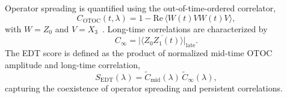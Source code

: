 \documentclass[twocolumn,10pt]{article}
\begin{document}
Operator spreading is quantified using the out-of-time-ordered correlator,
\begin{equation}
C_{\mathrm{OTOC}}(t,\lambda) = 1 - \mathrm{Re}\,\langle W(t) V W(t) V \rangle,
\end{equation}
with $W = Z_0$ and $V = X_3$~\cite{Larkin1969,Maldacena2016,Swingle2018}. Long-time correlations are characterized by
\begin{equation}
C_\infty = \overline{|\langle Z_0 Z_1(t) \rangle|}_{\mathrm{late}}.
\end{equation}
The EDT score is defined as the product of normalized mid-time OTOC amplitude and long-time correlation,
\begin{equation}
S_{\mathrm{EDT}}(\lambda) = \tilde{C}_{\mathrm{mid}}(\lambda)\,\tilde{C}_\infty(\lambda),
\end{equation}
capturing the coexistence of operator spreading and persistent correlations.






\end{document}
